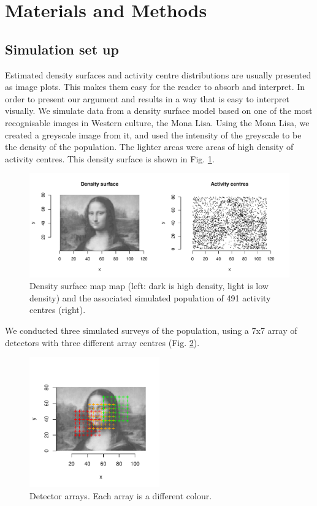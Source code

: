 \documentclass[a4paper,12pt]{article}
\begin{document}
\section{Materials and Methods}
\subsection{Simulation set up}

Estimated density surfaces and activity centre distributions are usually presented as image plots. This makes them easy for the reader to absorb and interpret. In order to present our argument and results in a way that is easy to interpret visually. We simulate data from a density surface model based on one of the most recognisable images in Western culture, the Mona Lisa. Using the Mona Lisa, we created a greyscale image from it, and used the intensity of the greyscale to be the density of the population. The lighter areas were areas of high density of activity centres. This density surface is shown in Fig. \ref{monalisaDpts}.

\begin{figure}[h!]
\centering
\includegraphics[width=1\textwidth]{monalisaDpts}
\caption{Density surface map map (left: dark is high density, light is low density) and the associated simulated population of 491 activity centres (right).}
\label{monalisaDpts}
\end{figure}

We conducted three simulated surveys of the population, using a 7x7 array of detectors with three different array centres (Fig. \ref{arrays}).

\begin{figure}[H]
\centering
\includegraphics[width=0.5\textwidth]{arrays}
\caption{Detector arrays. Each array is a different colour.}
\label{arrays}
\end{figure}
\end{document}
